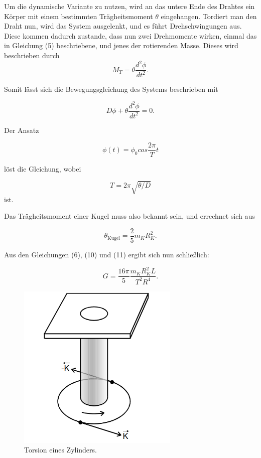 Um die dynamische Variante zu nutzen, wird an das untere Ende des Drahtes ein Körper mit einem bestimmten Trägheitsmoment $\theta$
eingehangen. Tordiert man den Draht nun, wird das System ausgelenkt, und es führt Drehschwingungen aus.
Diese kommen dadurch zustande, dass nun zwei Drehmomente wirken, einmal das in Gleichung (5) beschriebene, und jenes der rotierenden Masse.
Dieses wird beschrieben durch
\begin{equation}
  M_T = \theta \frac{d^{2}\phi}{dt^{2}} .
\end{equation}

Somit lässt sich die Bewegungsgleichung des Systems beschrieben mit

\begin{equation}
  D\phi + \theta \frac{d^{2}\phi}{dt^{2}} = 0 .
\end{equation}

Der Ansatz

\begin{equation}
  \phi(t) = \phi_0 cos \frac{2\pi}{T}t 
\end{equation}

löst die Gleichung, wobei

\begin{equation}
  T = 2 \pi \sqrt{\theta/D}  
\end{equation}
ist.

Das Trägheitsmoment einer Kugel muss also bekannt sein, und errechnet sich aus

\begin{equation}
  \theta_\text{Kugel} = \frac{2}{5}m_K R_K^{2} .
\end{equation}

Aus den Gleichungen (6), (10) und (11) ergibt sich nun schließlich:

\begin{equation}
 G = \frac{16\pi}{5} \frac{m_K R_K^{2}L}{T^{2}R^{4}} .
\end{equation}

\begin{figure}[H]
 \centering
  \includegraphics[height=8cm]{Screenshot (9).png}
  \caption{Torsion eines Zylinders.\cite{kent}}
  \label{fig:drill}
\end{figure}


